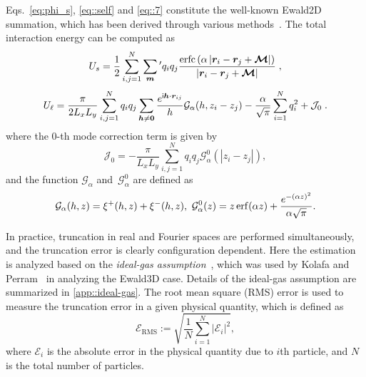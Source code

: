 Eqs.~\eqref{eq:phi_s}, \eqref{eq::self} and \eqref{eq::7} constitute the well-known Ewald2D summation, which has been derived through various methods~\cite{parry1975electrostatic,tornberg2016ewald,heyes1977molecular,de1979electrostatic,PhysRevB.61.6706}.
The total interaction energy can be computed as
\begin{equation}\label{eq::Us_Ewald2D}
    U_{s} =  \frac{1}{2} \sum_{i,j=1}^N \sum_{\bm{m}}{}^\prime q_i q_{j} \frac{\text{erfc}\left(\alpha \left|\bm{r}_i - \bm{r}_{j} + \boldsymbol{\mathcal{M}}\right|\right)}{\left|\bm{r}_i-\bm{r}_{j} + \boldsymbol{\mathcal{M}}\right|}\;,
\end{equation}
\begin{equation}\label{eq::Ul_Ewald2D}
    U_{\ell} =  \frac{\pi}{2L_xL_y}\sum_{i, j=1}^N  q_iq_{j} \sum_{\boldsymbol{h}\neq \boldsymbol{0}}\frac{e^{\mathsf i \boldsymbol{h}\cdot \boldsymbol{r}_{ij}}}{h}\mathcal{G}_{\alpha}(h,z_i - z_{j})  - \frac{\alpha}{\sqrt{\pi}}\sum_{i=1}^{N}q_i^2+\mathcal{J}_0\;.
\end{equation}
where the 0-th mode correction term is given by
\begin{equation}\label{eq::J0_Ewald2D}
\mathcal J_0 = -\frac{\pi}{L_xL_y}\sum_{i,j=1}^{N} q_iq_{j}\mathcal{G}_{\alpha}^0(|z_i-z_{j}|),
\end{equation}
and the function $\mathcal{G}_{\alpha}$ and~$\mathcal{G}_{\alpha}^0$ are defined as
\begin{equation}\label{eq::G_Ewald2D}
    \mathcal{G}_{\alpha}(h,z) = \xi^{+}(h, z)+\xi^{-}(h, z),~\mathcal{G}_{\alpha}^0(z) = {z} \operatorname{erf}(\alpha {z}) + \frac{e^{-(\alpha z)^2}}{\alpha \sqrt{\pi}}.
\end{equation}

In practice, truncation in real and Fourier spaces are performed simultaneously, and the truncation error is clearly configuration dependent.
Here the estimation is analyzed based on the \emph{ideal-gas assumption}~\cite{hansen2013theory}, which was used by Kolafa and Perram~\cite{kolafa1992cutoff} in analyzing the Ewald3D case. 
Details of the ideal-gas assumption are summarized in \ref{app::ideal-gas}.
The root mean square (RMS) error is used to measure the truncation error in a given physical quantity, which is defined as
\begin{equation}\label{RMS}
	\mathscr{E}_{\text{RMS}} := \sqrt{\frac{1}{N}\sum_{i=1}^{N}\left|\mathscr{E}_i\right|^2},
\end{equation}
where $\mathscr{E}_i$ is the absolute error in the physical quantity due to $i$th particle, and $N$ is the total number of particles.

